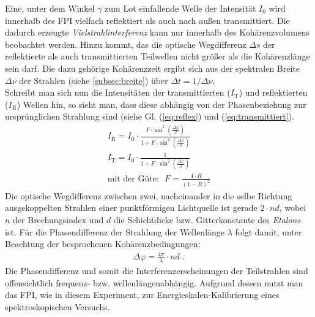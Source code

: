 \documentclass[numbers=noenddot,12pt,a4paper]{scrartcl}
\newcommand{\ix}[1]{_\text{#1}}
\newcommand{\tilt}[1]{\textit{#1}}
\begin{document}
Eine, unter dem Winkel $\gamma$ zum Lot einfallende Welle der Intensität $I\ix{0}$ wird innerhalb des FPI vielfach reflektiert als auch nach außen transmittiert. Die dadurch erzeugte \tilt{Vielstrahlinterferenz} kann nur innerhalb des Kohärenzvolumens beobachtet werden. Hinzu kommt, das die optische Wegdifferenz $\Delta s$ der reflektierte als auch transmittierten Teilwellen nicht größer als die Kohärenzlänge sein darf. Die dazu gehörige Kohärenzzeit ergibt sich aus der spektralen Breite $\Delta \nu$ der Strahlen (siehe \ref{subsec:breite}) über $\Delta t=1/\Delta\nu$.\\
Schreibt man sich nun die Intensitäten der transmittierten ($I\ix{T}$) und reflektierten ($I\ix{R}$) Wellen hin, so sieht man, dass diese abhängig von der Phasenbeziehung zur ursprünglichen Strahlung sind (siehe Gl. (\ref{eq:reflex}) und (\ref{eq:transmittiert}).
\begin{align}
	I\ix{R}=I\ix{0}\cdot\frac{F\cdot\sin^2\left(\frac{\Delta\varphi}{2}\right)}{1+F\cdot\sin^2\left(\frac{\Delta\varphi}{2}\right)} \label{eq:reflex}\\
	I\ix{T}=I\ix{0}\cdot\frac{1}{1+F\cdot\sin^2\left(\frac{\Delta\varphi}{2}\right)} \label{eq:transmittiert}\\
	\text{mit der Güte: } \,\, F=\frac{4\cdot R}{\left(1-R\right)^2}
\end{align}
Die optische Wegdifferenz zwischen zwei, nacheinander in die selbe Richtung ausgekoppelten Strahlen einer punktförmigen Lichtquelle ist gerade $2\cdot nd$, wobei $n$ der Brechungsindex und $d$ die Schichtdicke bzw. Gitterkonstante des \tilt{Etalons} ist. Für die Phasendifferenz der Strahlung der Wellenlänge $\lambda$ folgt damit, unter Beachtung der besprochenen Kohärenzbedingungen:
\begin{align}
	\Delta\varphi=\frac{4\pi}{\lambda}\cdot nd \label{eq:phasdiff} \,\,.
	\end{align}
Die Phasendifferenz und somit die Interferenzerscheinungen der Teilstrahlen sind offensichtlich frequenz- bzw. wellenlängenabhängig. Aufgrund dessen nutzt man das FPI, wie in diesem Experiment, zur Energieskalen-Kalibrierung eines spektroskopischen Versuchs.
\end{document}
